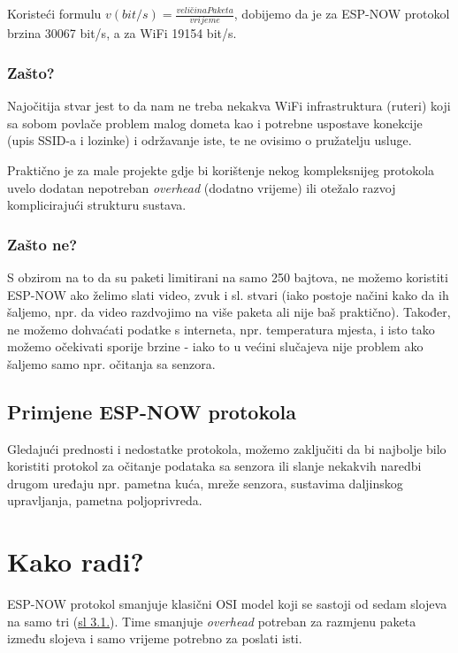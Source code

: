 \documentclass[seminarskirad]{fer}
\begin{document}
Koristeći formulu \( v (bit/s) = \frac{veličinaPaketa}{vrijeme}\), dobijemo da je za ESP-NOW protokol brzina 30067 bit/s, a za WiFi 19154 bit/s.

\subsection{Zašto?}

Najočitija stvar jest to da nam ne treba nekakva WiFi infrastruktura (ruteri) koji sa sobom povlače problem malog dometa kao i potrebne uspostave konekcije (upis SSID-a i lozinke) i održavanje iste, te ne ovisimo o pružatelju usluge. 

Praktično je za male projekte gdje bi korištenje nekog kompleksnijeg protokola uvelo dodatan nepotreban \textit{overhead} (dodatno vrijeme) ili otežalo razvoj komplicirajući strukturu sustava.

\subsection{Zašto ne?}

S obzirom na to da su paketi limitirani na samo 250 bajtova, ne možemo koristiti ESP-NOW ako želimo slati video, zvuk i sl. stvari (iako postoje načini kako da ih šaljemo, npr. da video razdvojimo na više paketa ali nije baš praktično). Također, ne možemo dohvaćati podatke s interneta, npr. temperatura mjesta, i isto tako možemo očekivati sporije brzine - iako to u većini slučajeva nije problem ako šaljemo samo npr. očitanja sa senzora.

\section{Primjene ESP-NOW protokola}

Gledajući prednosti i nedostatke protokola, možemo zaključiti da bi najbolje bilo koristiti protokol za očitanje podataka sa senzora ili slanje nekakvih naredbi drugom uređaju npr. pametna kuća, mreže senzora, sustavima daljinskog upravljanja, pametna poljoprivreda.


\chapter{Kako radi?}
\label{pog:kako_radi}

ESP-NOW protokol smanjuje klasični OSI model koji se sastoji od sedam slojeva na samo tri (\hyperref[slk:usporedbaosi]{sl 3.1.}). Time smanjuje \textit{overhead} potreban za razmjenu paketa između slojeva i samo vrijeme potrebno za poslati isti.
\end{document}
